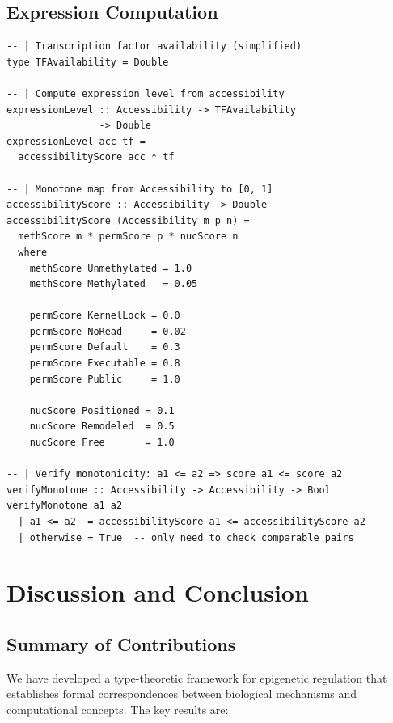 \documentclass[12pt,a4paper]{article}
\begin{document}
\subsection{Expression Computation}

\begin{lstlisting}[caption={Computing gene expression from accessibility state}]
-- | Transcription factor availability (simplified)
type TFAvailability = Double

-- | Compute expression level from accessibility
expressionLevel :: Accessibility -> TFAvailability
                -> Double
expressionLevel acc tf =
  accessibilityScore acc * tf

-- | Monotone map from Accessibility to [0, 1]
accessibilityScore :: Accessibility -> Double
accessibilityScore (Accessibility m p n) =
  methScore m * permScore p * nucScore n
  where
    methScore Unmethylated = 1.0
    methScore Methylated   = 0.05

    permScore KernelLock = 0.0
    permScore NoRead     = 0.02
    permScore Default    = 0.3
    permScore Executable = 0.8
    permScore Public     = 1.0

    nucScore Positioned = 0.1
    nucScore Remodeled  = 0.5
    nucScore Free       = 1.0

-- | Verify monotonicity: a1 <= a2 => score a1 <= score a2
verifyMonotone :: Accessibility -> Accessibility -> Bool
verifyMonotone a1 a2
  | a1 <= a2  = accessibilityScore a1 <= accessibilityScore a2
  | otherwise = True  -- only need to check comparable pairs
\end{lstlisting}

\section{Discussion and Conclusion}
\label{sec:discussion}

\subsection{Summary of Contributions}

We have developed a type-theoretic framework for epigenetic regulation that establishes formal correspondences between biological mechanisms and computational concepts. The key results are:
\end{document}
